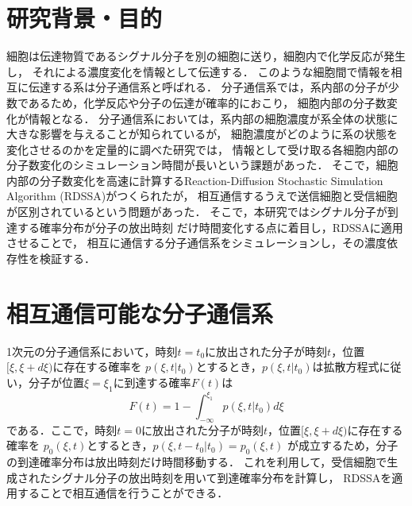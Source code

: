 \documentclass[twocolumn]{jarticle}
\begin{document}
\maketitle

\section{研究背景・目的}
細胞は伝達物質であるシグナル分子を別の細胞に送り，細胞内で化学反応が発生し，
それによる濃度変化を情報として伝達する．
このような細胞間で情報を相互に伝達する系は分子通信系と呼ばれる．
分子通信系では，系内部の分子が少数であるため，化学反応や分子の伝達が確率的におこり，
細胞内部の分子数変化が情報となる．
分子通信系においては，系内部の細胞濃度が系全体の状態に大きな影響を与えることが知られているが，
細胞濃度がどのように系の状態を変化させるのかを定量的に調べた研究\cite{Yamagishi}では，
情報として受け取る各細胞内部の分子数変化のシミュレーション時間が長いという課題があった．
そこで，細胞内部の分子数変化を高速に計算するReaction-Diffusion Stochastic Simulation Algorithm (RDSSA)\cite{hara}がつくられたが，
相互通信するうえで送信細胞と受信細胞が区別されているという問題があった．
そこで，本研究ではシグナル分子が到達する確率分布が分子の放出時刻
だけ時間変化する点に着目し，RDSSA\cite{hara}に適用させることで，
相互に通信する分子通信系をシミュレーションし，その濃度依存性を検証する．

\section{相互通信可能な分子通信系}
1次元の分子通信系において，時刻$t=t_0$に放出された分子が時刻$t$，位置$[\xi,\xi+d\xi)$に存在する確率を
$p(\xi,t|t_0)$とするとき，$p(\xi,t|t_0)$は拡散方程式に従い，分子が位置$\xi =\xi_1$に到達する確率$F(t)$は
\begin{equation}
    F(t) = 1- \int_{-\infty}^{\xi_1} p(\xi,t|t_0)d\xi
\end{equation}
である．ここで，時刻$t=0$に放出された分子が時刻$t$，位置$[\xi,\xi+d\xi)$に存在する確率を
$p_0(\xi,t)$とするとき，$p(\xi,t-t_0|t_0)=$$p_0(\xi,t)$
が成立するため，分子の到達確率分布は放出時刻だけ時間移動する．
これを利用して，受信細胞で生成されたシグナル分子の放出時刻を用いて到達確率分布を計算し，
RDSSA\cite{hara}を適用することで相互通信を行うことができる．
\end{document}
